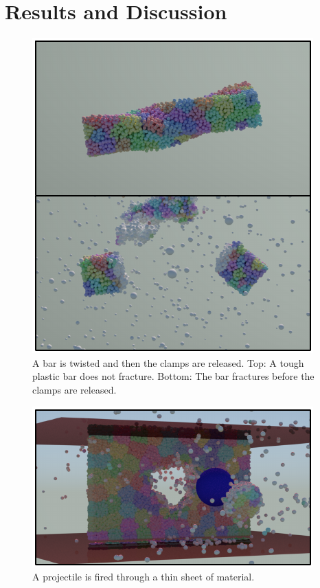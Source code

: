 \documentclass[review]{acmsiggraph}
\begin{document}
\section{Results and Discussion}
\begin{figure}[h!]
\includegraphics[width=\linewidth]{Figures/TwistedBar}
\caption{A bar is twisted and then the clamps are released.  Top: A tough plastic bar does not fracture.  Bottom: The bar fractures before the clamps are released.}
\label{fig:twistedbar}
\end{figure}

\begin{figure}
\includegraphics[width=\linewidth]{Figures/projectile}
\caption{A projectile is fired through a thin sheet of material.}
\label{fig:projectile}
\end{figure}
\end{document}
